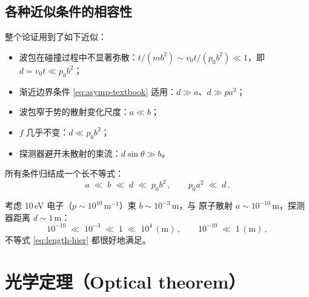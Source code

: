 \subsection{各种近似条件的相容性}

整个论证用到了如下近似：
\begin{itemize}
  \item 波包在碰撞过程中不显著弥散：$t/(mb^2)\sim v_0 t/(p_0 b^2)\ll 1$，即
        $d=v_0 t\ll p_0 b^2$；
  \item 渐近边界条件 \eqref{eq:asymp-textbook} 适用：$d\gg a$、$d\gg p a^2$；
  \item 波包窄于势的散射变化尺度：$a\ll b$；
  \item $f$ 几乎不变：$d\ll p_0 b^2$；
  \item 探测器避开未散射的束流：$d\sin\theta\gg b$。
\end{itemize}
所有条件归结成一个长不等式：
\begin{equation}
  \boxed{\;a \;\ll\; b \;\ll\; d \;\ll\; p_0 b^2\,,
  \qquad p_0 a^2 \;\ll\; d\,.\;}
  \label{eq:length-hier}
\end{equation}

\begin{example}[典型实验数量级]
考虑 10\,eV 电子（$p\sim 10^{10}\,\text{m}^{-1}$）束 $b\sim 10^{-3}$\,m，与
原子散射 $a\sim 10^{-10}$\,m，探测器距离 $d\sim 1$\,m：
\begin{equation*}
  10^{-10}\;\ll\;10^{-3}\;\ll\;1\;\ll\;10^{4}\,(\text{m})\,,
  \qquad 10^{-10}\;\ll\;1\,(\text{m})\,,
\end{equation*}
不等式 \eqref{eq:length-hier} 都很好地满足。
\end{example}

\section{光学定理（Optical theorem）}

